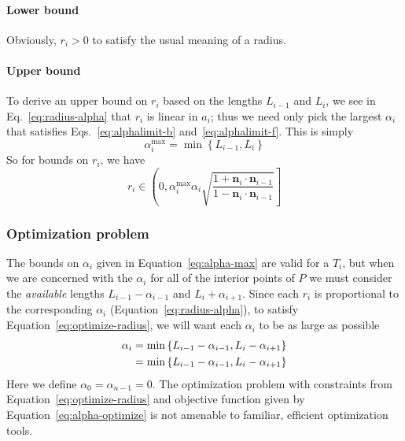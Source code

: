 \documentclass{article}
\begin{document}
\paragraph{Lower bound}
%
Obviously, $r_i > 0$ to satisfy the usual meaning of a radius.
%
\paragraph{Upper bound}
%
To derive an upper bound on $r_{i}$ based on the lengths $L_{i-1}$ and $L_i$, we see in Eq.~\eqref{eq:radius-alpha} that $r_{i}$ is linear in $a_{i}$; thus we need only pick the largest $\alpha_i$ that satisfies Eqs.~\eqref{eq:alphalimit-b} and~\eqref{eq:alphalimit-f}.  This is simply
%
\begin{equation}
  \label{eq:alpha-max}
  \alpha^{\max}_i = \min \left\{L_{i-1}, L_{i}\right\}
\end{equation}
%
So for bounds on $r_{i}$, we have
%
\begin{equation}
  \label{eq:rbounds}
  r_{i} \in \left(0, \alpha^{\max}_i \alpha_i\sqrt{\frac{1+\mathbf{n}_i\cdot \mathbf{n}_{i-1}}{1-\mathbf{n}_i\cdot \mathbf{n}_{i-1}}}\right]
\end{equation}
%
\subsubsection{Optimization problem}
\label{sec:optimization}
%
The bounds on $\alpha_i$ given in Equation~\eqref{eq:alpha-max} are valid for a $T_{i}$, but when we are concerned with the $\alpha_i$ for all of the interior points of $P$ we must consider the \emph{available} lengths $L_{i-1}-\alpha_{i-1}$ and $L_{i}+\alpha_{i+1}$.  Since each $r_{i}$ is proportional to the corresponding $\alpha_i$ (Equation~\eqref{eq:radius-alpha}), to satisfy Equation~\eqref{eq:optimize-radius}, we will want each $\alpha_i$ to be as large as possible
%
\begin{align}
  \notag
  \alpha_i &= \min \left\{L_{i-1}-\alpha_{i-1}, L_{i}-\alpha_{i+1}\right\} \\
  \label{eq:alpha-optimize}
  &= \min \left\{L_{i-1}-\alpha_{i-1}, L_{i}-\alpha_{i+1}\right\}
\end{align}
%
Here we define $\alpha_0 = \alpha_{n-1} = 0$.  The optimization problem with constraints from Equation~\eqref{eq:optimize-radius} and objective function given by Equation~\eqref{eq:alpha-optimize} is not amenable to familiar, efficient optimization tools.
%
\end{document}
